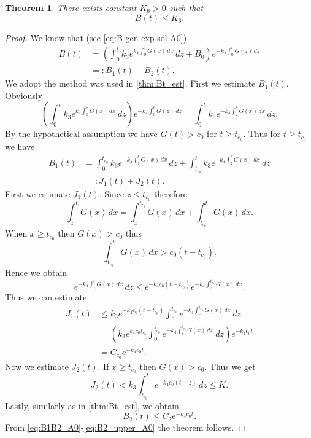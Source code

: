 \documentclass[pdflatex,sn-mathphys-num]{sn-jnl}
\theoremstyle{thmstyleone}
\newtheorem{theorem}{Theorem}[section]
\theoremstyle{thmstyletwo}
\theoremstyle{thmstylethree}
\begin{document}
\begin{theorem}\label{thm:B_upper_est_A0}
There exists constant $K_6>0$ such that
\begin{equation*}
B(t)\leq K_6.
\end{equation*}
\end{theorem}
\begin{proof}
We know that (see \eqref{eq:B gen exp sol A0}) 
\begin{align}\label{eq:B1B2_A0}
B(t) &=\left(
\int_0^t k_3 e^{k_4 \int_0^z G(x)\,dx}
\,dz+B_0\right)e^{-k_4 \int_0^t G(z)\,dz} \nonumber\\
&=:B_1(t)+B_2(t). 
\end{align}
We adopt the method was used in \autoref{thm:Bt_est}. 
First we estimate $B_1(t)$. Obviously 
\begin{equation*}
\left(\int_0^t k_3 e^{k_4 \int_0^z G(x)\,dx}
\,dz\right) e^{-k_4 \int_0^t G(z)\,dz}=\int_0^t k_3 e^{ -k_4 \int_z^t G(x)\,dx}
\,dz.
\end{equation*}
By the hypothetical assumption we have $G(t)> c_0$ for $t\geq t_{c_0}$. Thus for $t\geq t_{c_0}$ 
we have
\begin{align}\label{eq:J1J2_A0}
B_1(t) &= \int_0^{t_{c_0}} k_3 e^{-k_4 \int_z^t G(x)\,dx}
\,dz+\int_{t_{c_0}}^t k_3 e^{ -k_4 \int_z^t G(x)\,dx}\,dz \nonumber \\
&=:J_1(t)+J_2(t).
\end{align}
First we estimate $J_1(t)$. Since $z\leq t_{c_0}$ therefore
\begin{equation*}
\int_z^t G(x)\,dx=\int_z^{t_{c_0}} G(x)\,dx+\int_{t_{c_0}}^t G(x)\,dx.
\end{equation*}
When $x\geq t_{c_0}$ then $G(x)> c_0$ thus
\begin{equation*}
\int_{t_{c_0}}^t G(x)\,dx>c_0 (t-t_{c_0}).
\end{equation*}
Hence we obtain
\begin{equation*}
e^{-k_4\int_z^t G(x)\,dx}\,dz \leq e^{-k_4 c_0(t-t_{c_0})} e^{-k_4 \int_z^{t_{c_0}} G(x)\,dx}.
\end{equation*}
Thus we can estimate
\begin{align}
J_1(t) &\leq k_3 e^{-k_4 c_0(t-t_{c_0})} \int_0^{t_{c_0}}e^{-k_4\int_z^{t_{c_0}} G(x)\,dx}\,dz\nonumber\\
&=\left(  k_3 e^{k_4 c_0 t_{c_0}} \int_0^{t_{c_0}}e^{-k_4\int_z^{t_{c_0}} G(x)\,dx}\,dz \right)
e^{-k_4c_0 t}\nonumber\\
&=C_{c_0}e^{-k_4 c_0 t}.
\end{align}
Now we estimate $J_2(t)$. If $x\geq t_{c_0}$ then $G(x)>c_0$. Thus we get 
\begin{equation}
J_2(t)< k_3 \int_{t_{c_0}}^t e^{-k_4c_0(t-z)}\,dz\leq K.
\end{equation}
Lastly, similarly as in \autoref{thm:Bt_est}, we obtain. 
\begin{equation}\label{eq:B2_upper_A0}
    B_2(t)\leq C_2 e^{-k_4 c_0 t}.
\end{equation}
From \eqref{eq:B1B2_A0}-\eqref{eq:B2_upper_A0} the theorem follows.
\end{proof}
\end{document}
